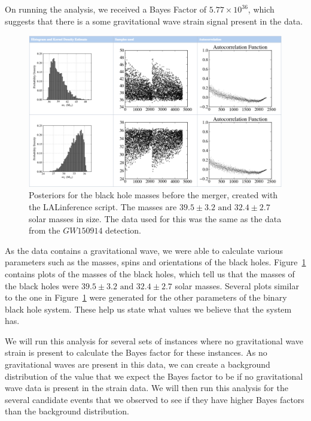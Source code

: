 \documentclass{article}
\begin{document}
 
  On running the analysis, we received a Bayes Factor of $5.77\times 10^{36}$, which suggests that there is a some gravitational wave strain signal present in the data.\\
 
      \begin{figure}[h]
      	\centering
      	\includegraphics[width=1\textwidth]{Figures/LALinferenceMasses.png} 
      	\caption{Posteriors for the black hole masses before the merger, created with the LALinference script. The masses are $39.5\pm3.2 \text{ and } 32.4\pm2.7$ solar masses in size. The data used for this was the same as the data from the $GW150914$ detection.}
      	\label{Fig:LALinferenceMasses}
      \end{figure}
      
      
 As the data contains a gravitational wave, we were able to calculate various parameters such as the masses, spins and orientations of the black holes. Figure~\ref{Fig:LALinferenceMasses} contains plots of the masses of the black holes, which tell us that the masses of the black holes were $39.5\pm3.2 \text{ and } 32.4\pm2.7$ solar masses. Several plots similar to the one in Figure~\ref{Fig:LALinferenceMasses} were generated for the other parameters of the binary black hole system. These help us state what values we believe that the system has. 
 
 We will run this analysis for several sets of instances where no gravitational wave strain is present to calculate the Bayes factor for these instances. As no gravitational waves are present in this data, we can create a background distribution of the value that we expect the Bayes factor to be if no gravitational wave data is present in the strain data. We will then run this analysis for the several candidate events that we observed to see if they have higher Bayes factors than the background distribution. 
 
\end{document}
